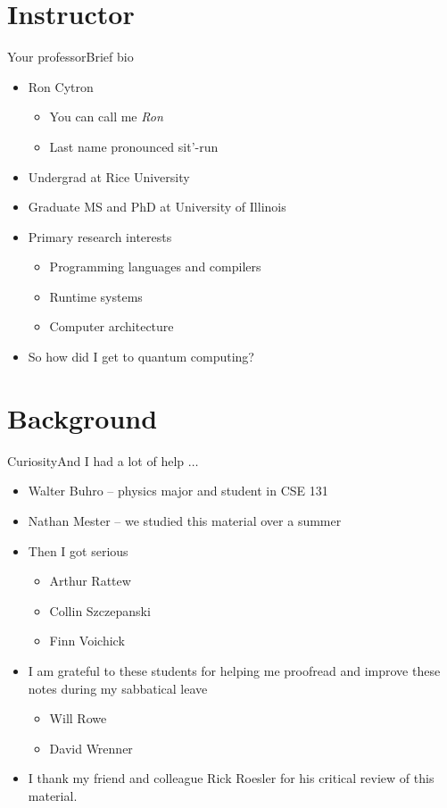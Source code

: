 \section{Instructor}
\begin{frame}{Your professor}{Brief bio}
\begin{itemize}
    \item Ron Cytron
    \begin{itemize}
        \item You can call me \emph{Ron}
        \item Last name pronounced sit'-run
    \end{itemize}
    \item Undergrad at Rice University
    \item Graduate MS and PhD at University of Illinois
    \item Primary research interests
    \begin{itemize}
        \item Programming languages and compilers
        \item Runtime systems
        \item Computer architecture
    \end{itemize}
    \item So how did I get to quantum computing?
\end{itemize}
    
\end{frame}

\section{Background}
\begin{frame}{Curiosity}{And I had a lot of help $\ldots$}
\begin{itemize}
    \item Walter Buhro -- physics major and student in CSE 131
    \item Nathan Mester -- we studied this material over a summer
    \item Then I got serious
    \begin{itemize}
        \item Arthur Rattew
        \item Collin Szczepanski
        \item Finn Voichick
    \end{itemize}
    \item I am grateful to these students for helping me proofread and improve these notes during my sabbatical leave
    \begin{itemize}
        \item Will Rowe
        \item David Wrenner
    \end{itemize}
    \item I thank my friend and colleague Rick Roesler for his critical review of this material.
\end{itemize}
    
\end{frame}

